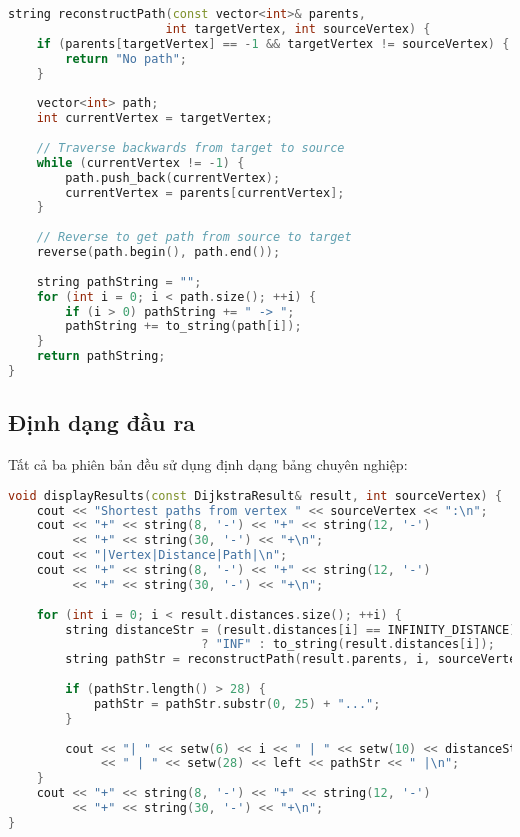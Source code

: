 \documentclass[12pt]{article}
\begin{document}
\begin{lstlisting}[language=C++, basicstyle=\ttfamily\footnotesize, frame=single]
string reconstructPath(const vector<int>& parents, 
                      int targetVertex, int sourceVertex) {
    if (parents[targetVertex] == -1 && targetVertex != sourceVertex) {
        return "No path";
    }
    
    vector<int> path;
    int currentVertex = targetVertex;
    
    // Traverse backwards from target to source
    while (currentVertex != -1) {
        path.push_back(currentVertex);
        currentVertex = parents[currentVertex];
    }
    
    // Reverse to get path from source to target
    reverse(path.begin(), path.end());
    
    string pathString = "";
    for (int i = 0; i < path.size(); ++i) {
        if (i > 0) pathString += " -> ";
        pathString += to_string(path[i]);
    }
    return pathString;
}
\end{lstlisting}

\subsection*{Định dạng đầu ra}

Tất cả ba phiên bản đều sử dụng định dạng bảng chuyên nghiệp:

\begin{lstlisting}[language=C++, basicstyle=\ttfamily\footnotesize, frame=single]
void displayResults(const DijkstraResult& result, int sourceVertex) {
    cout << "Shortest paths from vertex " << sourceVertex << ":\n";
    cout << "+" << string(8, '-') << "+" << string(12, '-') 
         << "+" << string(30, '-') << "+\n";
    cout << "|Vertex|Distance|Path|\n";
    cout << "+" << string(8, '-') << "+" << string(12, '-') 
         << "+" << string(30, '-') << "+\n";
    
    for (int i = 0; i < result.distances.size(); ++i) {
        string distanceStr = (result.distances[i] == INFINITY_DISTANCE) 
                           ? "INF" : to_string(result.distances[i]);
        string pathStr = reconstructPath(result.parents, i, sourceVertex);
        
        if (pathStr.length() > 28) {
            pathStr = pathStr.substr(0, 25) + "...";
        }
        
        cout << "| " << setw(6) << i << " | " << setw(10) << distanceStr 
             << " | " << setw(28) << left << pathStr << " |\n";
    }
    cout << "+" << string(8, '-') << "+" << string(12, '-') 
         << "+" << string(30, '-') << "+\n";
}
\end{lstlisting}
\end{document}
